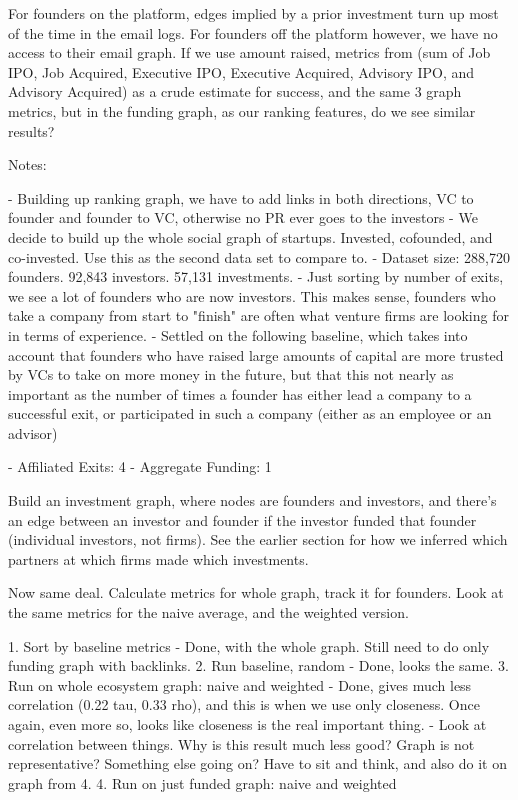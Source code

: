 For founders on the platform, edges implied by a prior investment turn up most of the time in the email logs. For founders off the platform however, we have no access to their email graph. If we use amount raised, metrics from \cite{2017arXiv170604229H} (sum of Job IPO, Job Acquired, Executive IPO, Executive Acquired, Advisory IPO, and Advisory Acquired) as a crude estimate for success, and the same 3 graph metrics, but in the funding graph, as our ranking features, do we see similar results?

Notes:

- Building up ranking graph, we have to add links in both directions, VC to founder and founder to VC, otherwise no PR ever goes to the investors
- We decide to build up the whole social graph of startups. Invested, cofounded, and co-invested. Use this as the second data set to compare to.
- Dataset size: 288,720 founders. 92,843 investors. 57,131 investments.
- Just sorting by number of exits, we see a lot of founders who are now investors. This makes sense, founders who take a company from start to "finish" are often what venture firms are looking for in terms of experience.
- Settled on the following baseline, which takes into account that founders who have raised large amounts of capital are more trusted by VCs to take on more money in the future, but that this not nearly as important as the number of times a founder has either lead a company to a successful exit, or participated in such a company (either as an employee or an advisor)

- Affiliated Exits: 4
- Aggregate Funding: 1

Build an investment graph, where nodes are founders and investors, and there's an edge between an investor and founder if the investor funded that founder (individual investors, not firms). See the earlier section for how we inferred which partners at which firms made which investments.

Now same deal. Calculate metrics for whole graph, track it for founders. Look at the same metrics for the naive average, and the weighted version.

1. Sort by baseline metrics
  - Done, with the whole graph. Still need to do only funding graph with backlinks.
2. Run baseline, random
  - Done, looks the same.
3. Run on whole ecosystem graph: naive and weighted
  - Done, gives much less correlation (0.22 tau, 0.33 rho), and this is when we use only closeness. Once again, even more so, looks like closeness is the real important thing.
  - Look at correlation between things. Why is this result much less good? Graph is not representative? Something else going on? Have to sit and think, and also do it on graph from 4.
4. Run on just funded graph: naive and weighted



